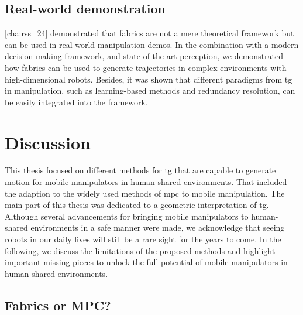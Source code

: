 \subsection{Real-world demonstration}
\label{sec:conclusion_real_world}

\cref{cha:rss_24} demonstrated that \ac{fabrics} are not a mere theoretical
framework but can be used in real-world manipulation demos. In the combination
with a modern decision making framework, and state-of-the-art perception, 
we demonstrated how \ac{fabrics} can be used to generate trajectories in complex
environments with high-dimensional robots. Besides, it was shown that different
paradigms from \ac{tg} in manipulation, such as learning-based methods and
redundancy resolution, can be easily integrated into the framework.

\section{Discussion}
\label{sec:discussion}

This thesis focused on different methods for \ac{tg} that are capable to
generate motion for mobile manipulators in human-shared environments. That
included the adaption to the widely used methods of \ac{mpc} to mobile
manipulation. The main part of this thesis was dedicated to a geometric
interpretation of \ac{tg}. Although several advancements for bringing mobile
manipulators to human-shared environments in a safe manner were made, we acknowledge
that seeing robots in our daily lives will still be a rare sight for the years
to come. In the following, we discuss the limitations of the proposed methods
and highlight important missing pieces to unlock the full potential of mobile
manipulators in human-shared environments.

\subsection{Fabrics or MPC?}
\label{sec:discussion_fabrics_or_mpc}

